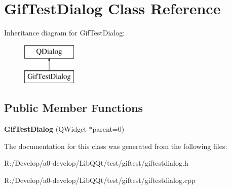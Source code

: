 \hypertarget{class_gif_test_dialog}{}\section{Gif\+Test\+Dialog Class Reference}
\label{class_gif_test_dialog}
Inheritance diagram for Gif\+Test\+Dialog\+:\begin{figure}[H]
\begin{center}
\leavevmode
\includegraphics[height=2.000000cm]{class_gif_test_dialog}
\end{center}
\end{figure}
\subsection*{Public Member Functions}
\begin{DoxyCompactItemize}
\item 
\mbox{\label{class_gif_test_dialog_a884168becd6d7508d3de329e58656fc7}} 
{\bfseries Gif\+Test\+Dialog} (Q\+Widget $\ast$parent=0)
\end{DoxyCompactItemize}


The documentation for this class was generated from the following files\+:\begin{DoxyCompactItemize}
\item 
R\+:/\+Develop/a0-\/develop/\+Lib\+Q\+Qt/test/giftest/giftestdialog.\+h\item 
R\+:/\+Develop/a0-\/develop/\+Lib\+Q\+Qt/test/giftest/giftestdialog.\+cpp\end{DoxyCompactItemize}
